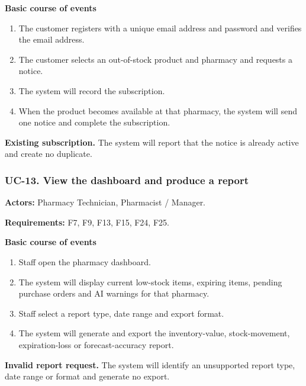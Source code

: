 \textbf{Basic course of events}
\begin{enumerate}
\item The customer registers with a unique email address and password and verifies the email address.
\item The customer selects an out-of-stock product and pharmacy and requests a notice.
\item The system will record the subscription.
\item When the product becomes available at that pharmacy, the system will send one notice and complete the subscription.
\end{enumerate}

\textbf{Existing subscription.} The system will report that the notice is already active and create no duplicate.


\clearpage
\subsubsection*{UC-13. View the dashboard and produce a report}
\textbf{Actors:} Pharmacy Technician, Pharmacist / Manager.

\textbf{Requirements:} F7, F9, F13, F15, F24, F25.

\textbf{Basic course of events}
\begin{enumerate}
\item Staff open the pharmacy dashboard.
\item The system will display current low-stock items, expiring items, pending purchase orders and AI warnings for that pharmacy.
\item Staff select a report type, date range and export format.
\item The system will generate and export the inventory-value, stock-movement, expiration-loss or forecast-accuracy report.
\end{enumerate}

\textbf{Invalid report request.} The system will identify an unsupported report type, date range or format and generate no export.


